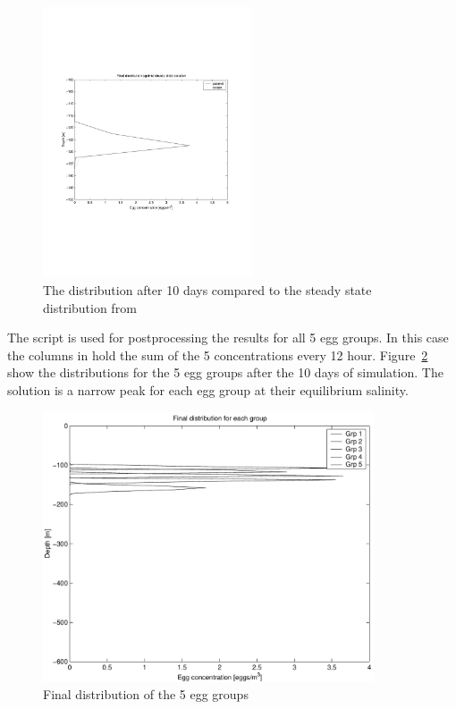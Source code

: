 \begin{figure}[!htb]
\begin{center}
\includegraphics[height=8cm]{ex6e}
\end{center}
\caption{The distribution after 10 days compared to the
         steady state distribution from }
\label{fig:ex6e}
\end{figure}


The script  is used for postprocessing the results for
all 5 egg groups. In this case the columns in  hold the sum of the
5 concentrations every 12 hour.
Figure~\ref{fig:ex6f} show the distributions for the 5 egg groups
after the 10 days of simulation. 
The solution is a narrow peak for each egg group at their equilibrium
salinity.


\begin{figure}[!htb]
\begin{center}
\includegraphics[height=8cm]{ex6f}
\end{center}
\caption{Final distribution of the 5 egg groups}
\label{fig:ex6f}
\end{figure}

